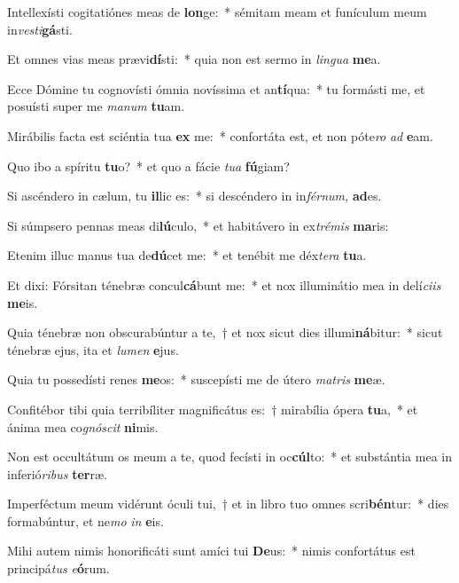 \item Intellexísti cogitatiónes meas de \textbf{lon}ge:~* sémitam meam et funículum meum in\textit{vesti}\textbf{gá}sti.
\item Et omnes vias meas prævi\textbf{dí}sti:~* quia non est sermo in \textit{lingua} \textbf{me}a.
\item Ecce Dómine tu cognovísti ómnia novíssima  et an\textbf{tí}qua:~* tu formásti me, et posuísti super me \textit{manum} \textbf{tu}am.
\item Mirábilis facta est sciéntia tua \textbf{ex} me:~* confortáta est, et non póte\textit{ro} \textit{ad} \textbf{e}am.
\item Quo ibo a spíritu \textbf{tu}o?~* et quo a fácie \textit{tua} \textbf{fú}giam?
\item Si ascéndero in cælum, tu \textbf{il}lic es:~* si descéndero in in\textit{férnum,} \textbf{ad}es.
\item Si súmpsero pennas meas di\textbf{lú}culo,~* et habitávero in ex\hspace*{0.02em}\textit{trémis} \textbf{ma}ris:
\item Etenim illuc manus tua de\textbf{dú}cet me:~* et tenébit me déx\hspace*{0.02em}\textit{tera} \textbf{tu}a.
\item Et dixi: Fórsitan ténebræ concul\textbf{cá}bunt me:~* et nox illuminátio mea in delí\hspace*{0.02em}\textit{ciis} \textbf{me}is.
\item Quia ténebræ non obscurabúntur a te,~† et nox sicut dies illumi\textbf{ná}bitur:~* sicut ténebræ ejus, ita et \textit{lumen} \textbf{e}jus.
\item Quia tu possedísti renes \textbf{me}os:~* suscepísti me de útero \textit{matris} \textbf{me}æ.
\item Confitébor tibi quia terribíliter magnificátus es:~† mirabília ópera \textbf{tu}a,~* et ánima mea co\textit{gnóscit} \textbf{ni}mis.
\item Non est occultátum os meum a te, quod fecísti in oc\textbf{cúl}to:~* et substántia mea in inferió\textit{ribus} \textbf{ter}ræ.
\item Imperféctum meum vidérunt óculi tui,~† et in libro tuo omnes scri\textbf{bén}tur:~* dies formabúntur, et ne\textit{mo} \textit{in} \textbf{e}is.
\item Mihi autem nimis honorificáti sunt amíci tui \textbf{De}us:~* nimis confortátus est principá\hspace*{0.02em}\textit{tus} \textit{e}\textbf{ó}rum.

